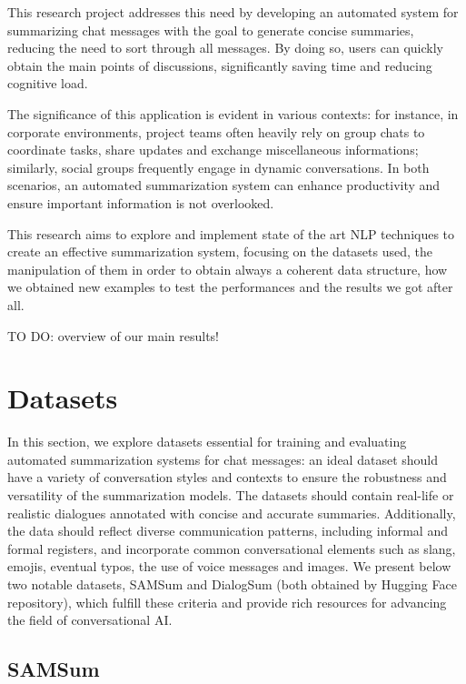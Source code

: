 \documentclass[10pt,twocolumn,letterpaper]{article}
\begin{document}
This research project addresses this need by developing an automated system for summarizing chat messages with the goal to generate concise summaries, reducing the need to sort through all messages. By doing so, users can quickly obtain the main points of discussions, significantly saving time and reducing cognitive load.

The significance of this application is evident in various contexts: for instance, in corporate environments, project teams often heavily rely on group chats to coordinate tasks, share updates and exchange miscellaneous informations; similarly, social groups frequently engage in dynamic conversations. In both scenarios, an automated summarization system can enhance productivity and ensure important information is not overlooked.

This research aims to explore and implement state of the art NLP techniques to create an effective summarization system, focusing on the datasets used, the manipulation of them in order to obtain always a coherent data structure, how we obtained new examples to test the performances and the results we got after all.

TO DO: overview of our main results!

\section{Datasets}

In this section, we explore datasets essential for training and evaluating automated summarization systems for chat messages: an ideal dataset should have a variety of conversation styles and contexts to ensure the robustness and versatility of the summarization models. The datasets should contain real-life or realistic dialogues annotated with concise and accurate summaries. Additionally, the data should reflect diverse communication patterns, including informal and formal registers, and incorporate common conversational elements such as slang, emojis, eventual typos, the use of voice messages and images. We present below two notable datasets, SAMSum and DialogSum (both obtained by Hugging Face repository), which fulfill these criteria and provide rich resources for advancing the field of conversational AI.

\subsection{SAMSum}
\end{document}

